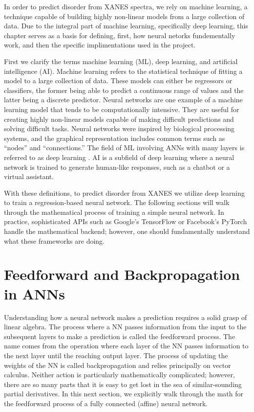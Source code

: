 In order to predict disorder from XANES spectra, we rely on machine learning, a technique capable of building highly non-linear models from a large collection of data. Due to the integral part of machine learning, specifically deep learning, this chapter serves as a basis for defining, first, how neural netorks fundementally work, and then the specific implimentations used in the project.

First we clarify the terms machine learning (ML), deep learning, and artificial intelligence (AI). Machine learning refers to the statistical technique of fitting a model to a large collection of data. These models can either be regressors or classifiers, the former being able to predict a continuous range of values and the latter being a discrete predictor. Neural networks are one example of a machine learning model that tends to be computationally intensive. They are useful for creating highly non-linear models capable of making difficult predictions and solving difficult tasks. Neural networks were inspired by biological processing systems, and the graphical representation includes common terms such as ``nodes'' and ``connections.'' The field of ML involving ANNs with many layers is referred to as deep learning \cite{schmidhuber2015deep}. AI is a subfield of deep learning where a neural network is trained to generate human-like responses, such as a chatbot or a virtual assistant. 

With these definitions, to predict disorder from XANES we utilize deep learning to train a regression-based neural network. The following sections will walk through the mathematical process of training a simple neural network. In practice, sophisticated APIs such as Google's TensorFlow or Facebook's PyTorch handle the mathematical backend; however, one should fundamentally understand what these frameworks are doing.

\section{Feedforward and Backpropagation in ANNs}

Understanding how a neural network makes a prediction requires a solid grasp of linear algebra. The process where a NN passes information from the input to the subsequent layers to make a prediction is called the feedforward process. The name comes from the operation where each layer of the NN passes information to the next layer until the reaching output layer. The process of updating the weights of the NN is called backpropagation and relies principally on vector calculus. Neither action is particularly mathematically complicated; however, there are so many parts that it is easy to get lost in the sea of similar-sounding partial derivatives. In this next section, we explicitly walk through the math for the feedforward process of a fully connected (affine) neural network.

